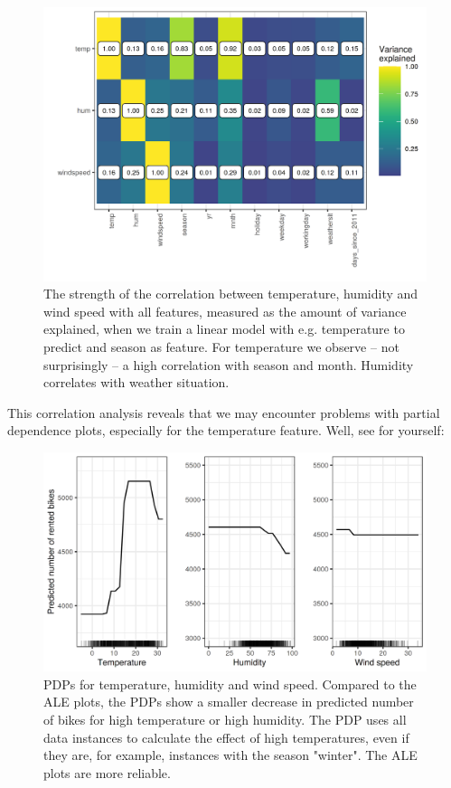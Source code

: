\documentclass[12pt,]{krantz}
\begin{document}
\begin{figure}

{\centering \includegraphics[width=\textwidth]{images/ale-bike-cor-1} 

}

\caption{The strength of the correlation between temperature, humidity and wind speed with all features, measured as the amount of variance explained, when we train a linear model with e.g. temperature to predict and season as feature. For temperature we observe -- not surprisingly -- a high correlation with season and month. Humidity correlates with weather situation.}\label{fig:ale-bike-cor}
\end{figure}

This correlation analysis reveals that we may encounter problems with
partial dependence plots, especially for the temperature feature. Well,
see for yourself:

\begin{figure}

{\centering \includegraphics[width=\textwidth]{images/pdp-bike-compare-1} 

}

\caption{PDPs for temperature, humidity and wind speed. Compared to the ALE plots, the PDPs show a smaller decrease in predicted number of bikes for high temperature or high humidity. The PDP uses all data instances to calculate the effect of high temperatures, even if they are, for example, instances with the season "winter". The ALE plots are more reliable.}\label{fig:pdp-bike-compare}
\end{figure}
\end{document}

